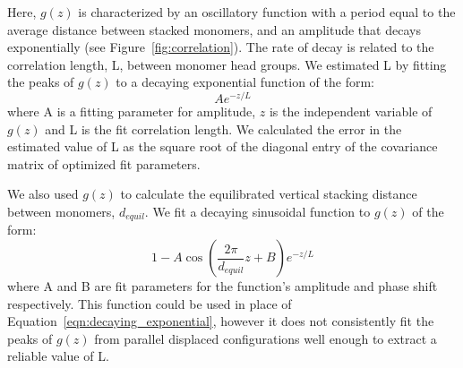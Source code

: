 \documentclass[journal=jpcbfk,manuscript=article]{achemso}
\begin{document}
  Here, $g(z)$ is characterized by an oscillatory function with a period equal to the
  average distance between stacked monomers, and an amplitude that decays exponentially
  (see Figure~\ref{fig:correlation}). The rate of decay is related to the correlation 
  length, L, between monomer head groups. We estimated L by fitting the peaks of $g(z)$
  to a decaying exponential function of the form:
  \begin{equation}
  	Ae^{-z/L}
  	\label{eqn:decaying_exponential}
  \end{equation}
  where A is a fitting parameter for amplitude, $z$ is the independent variable of $g(z)$ 
  and L is the fit correlation length. We calculated the error in the estimated value
  of L as the square root of the diagonal entry of the covariance matrix of 
  optimized fit parameters.  %
  
  We also used $g(z)$ to calculate the equilibrated vertical stacking distance between
  monomers, $d_{equil}$. 
  We fit a decaying sinusoidal function to $g(z)$ of the form:
  \begin{equation}
  	1 - A\cos\left(\frac{2\pi}{\mathit{d}_{equil}}z + B\right)e^{-z/L}
  	\label{eqn:decaying_sinusoid}
  \end{equation}
  where A and B are fit parameters for the function's amplitude and phase shift respectively.
  This function could be used in place of Equation~\ref{eqn:decaying_exponential}, however
  it does not consistently fit the peaks of $g(z)$ from parallel displaced configurations 
  well enough to extract a reliable value of L.


\end{document}
